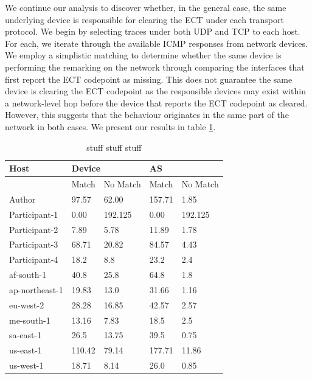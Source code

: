 \documentclass{l4proj}
\begin{document}
We continue our analysis to discover whether, in the general case, the same underlying device is responsible for clearing the ECT under each transport protocol. We begin by selecting traces under both UDP and TCP to each host. For each, we iterate through the available ICMP responses from network devices. We employ a simplistic matching to determine whether the same device is performing the remarking on the network through comparing the interfaces that first report the ECT codepoint as missing. This does not guarantee the same device is clearing the ECT codepoint as the responsible devices may exist within a network-level hop before the device that reports the ECT codepoint as cleared. However, this suggests that the behaviour originates in the same part of the network in both cases. We present our results in table \ref{tab:udptcp}.

\begin{table}[H]
\centering
\begin{tabular}{|l|l|p{1cm}|l|p{1cm}|}
\hline
Host          & \multicolumn{2}{l|}{Device} & \multicolumn{2}{l|}{AS} \\ \hline
              & Match    & No \newline Match    & Match  & No \newline Match  \\ \hline
Author        & 97.57     & 62.00            & 157.71      & 1.85        \\ \hline
Participant-1 & 0.00     & 192.125            & 0.00      & 192.125        \\ \hline
Participant-2 & 7.89      & 5.78            & 11.89      & 1.78         \\ \hline
Participant-3 & 68.71     & 20.82            & 84.57      & 4.43        \\ \hline
Participant-4 & 18.2      & 8.8            & 23.2      & 2.4         \\ \hline
af-south-1        & 40.8     & 25.8            & 64.8      & 1.8        \\ \hline
ap-northeast-1 & 19.83     & 13.0            & 31.66      & 1.16        \\ \hline
eu-west-2 & 28.28      & 16.85            & 42.57      & 2.57         \\ \hline
me-south-1 & 13.16     & 7.83            & 18.5      & 2.5        \\ \hline
sa-east-1 & 26.5      & 13.75            & 39.5      & 0.75         \\ \hline
us-east-1 & 110.42      &  79.14  & 177.71      & 11.86         \\ \hline
us-west-1 & 18.71      & 8.14         & 26.0      & 0.85         \\ \hline
\end{tabular}

\caption{stuff stuff stuff}
\label{tab:udptcp}

\end{table}
\end{document}
